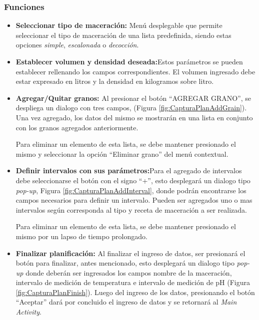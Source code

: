             \subsubsection{Funciones}
                \begin{itemize}
                    \item \textbf{Seleccionar tipo de maceración:} Menú desplegable que permite seleccionar el tipo de maceración de una lista predefinida, siendo estas opciones \textit{simple}, \textit{escalonada} o \textit{decocción}.
                    
                    \item \textbf{Establecer volumen y densidad deseada:}Estos parámetros se pueden establecer rellenando los campos correspondientes. El volumen ingresado debe estar expresado en litros y la densidad en kilogramos sobre litro.
                    
                    \item \textbf{Agregar/Quitar granos:} Al presionar el botón ``AGREGAR GRANO'', se despliega un dialogo con tres campos, (Figura \ref{fig:CapturaPlanAddGrain}). Una vez agregado, los datos del mismo se mostrarán en una lista en conjunto con los granos agregados anteriormente.
                    
                        \par Para eliminar un elemento de esta lista, se debe mantener presionado el mismo y seleccionar la opción ``Eliminar grano'' del menú contextual.
                    
                    \item \textbf{Definir intervalos con sus parámetros:}Para el agregado de intervalos debe seleccionarse el botón con el signo ``+'', esto desplegará un dialogo tipo \textit{pop-up}, Figura \ref{fig:CapturaPlanAddInterval}, donde podrán encontrarse los campos necesarios para definir un intervalo. Pueden ser agregados uno o mas intervalos según corresponda al tipo y receta de maceración a ser realizada.
                        \par Para eliminar un elemento de esta lista, se debe mantener presionado el mismo por un lapso de tiempo prolongado.
                    
                    \item \textbf{Finalizar planificación:} Al finalizar el ingreso de datos, ser presionará el botón para finalizar, antes mencionado, esto desplegará un dialogo tipo \textit{pop-up} donde deberán ser ingresados los campos nombre de la maceración, intervalo de medición de temperatura e intervalo de medición de pH (Figura \ref{fig:CapturaPlanFinish}). Luego del ingreso de los datos, presionando el botón ``Aceptar'' dará por concluido el ingreso de datos y se retornará al \textit{Main Activity}.
                    

\end{itemize}
